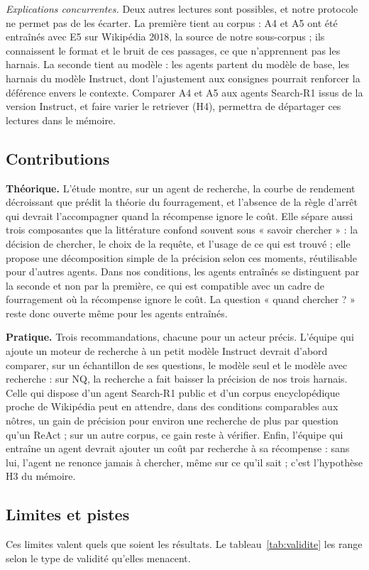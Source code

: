 \emph{Explications concurrentes.} Deux autres lectures sont possibles, et notre protocole ne permet pas de les écarter. La première tient au corpus : A4 et A5 ont été entraînés avec E5 sur Wikipédia 2018, la source de notre sous-corpus ; ils connaissent le format et le bruit de ces passages, ce que n'apprennent pas les harnais. La seconde tient au modèle : les agents partent du modèle de base, les harnais du modèle Instruct, dont l'ajustement aux consignes pourrait renforcer la déférence envers le contexte. Comparer A4 et A5 aux agents Search-R1 issus de la version Instruct, et faire varier le retriever (H4), permettra de départager ces lectures dans le mémoire.

\subsection{Contributions}
\textbf{Théorique.} L'étude montre, sur un agent de recherche, la courbe de rendement décroissant que prédit la théorie du fourragement, et l'absence de la règle d'arrêt qui devrait l'accompagner quand la récompense ignore le coût. Elle sépare aussi trois composantes que la littérature confond souvent sous « savoir chercher » : la décision de chercher, le choix de la requête, et l'usage de ce qui est trouvé ; elle propose une décomposition simple de la précision selon ces moments, réutilisable pour d'autres agents. Dans nos conditions, les agents entraînés se distinguent par la seconde et non par la première, ce qui est compatible avec un cadre de fourragement où la récompense ignore le coût. La question « quand chercher ? » reste donc ouverte même pour les agents entraînés.

\textbf{Pratique.} Trois recommandations, chacune pour un acteur précis. L'équipe qui ajoute un moteur de recherche à un petit modèle Instruct devrait d'abord comparer, sur un échantillon de ses questions, le modèle seul et le modèle avec recherche : sur NQ, la recherche a fait baisser la précision de nos trois harnais. Celle qui dispose d'un agent Search-R1 public et d'un corpus encyclopédique proche de Wikipédia peut en attendre, dans des conditions comparables aux nôtres, un gain de précision pour environ une recherche de plus par question qu'un ReAct ; sur un autre corpus, ce gain reste à vérifier. Enfin, l'équipe qui entraîne un agent devrait ajouter un coût par recherche à sa récompense : sans lui, l'agent ne renonce jamais à chercher, même sur ce qu'il sait ; c'est l'hypothèse H3 du mémoire.

\subsection{Limites et pistes}
Ces limites valent quels que soient les résultats. Le tableau~\ref{tab:validite} les range selon le type de validité qu'elles menacent.


